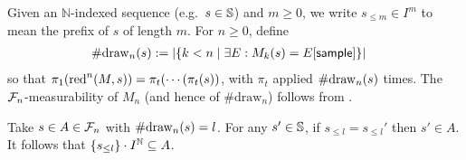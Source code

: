 Given an $\mathbb N$-indexed sequence (e.g.~$s \in {\mathbb{S}}$) and $m \geq 0$, we write $s_{\leq m} \in I^m$ to mean the prefix of $s$ of length $m$.
For $n \geq 0$, define
\begin{align*}
\#\mathrm{draw}_{n}(s) &:= |\{k < n \mid \exists E: M_k(s) = E[\mathsf{sample}]\}|
\end{align*}
so that $\pi_1 (\red^n(M, s)) = %
\pi_t( \cdots (\pi_t (s))$, with $\pi_t$ applied ${\#\mathrm{draw}_{n}(s)}$ times.
The $\mathcal{F}_n$-measurability of $M_n$ (and hence of $\#\mathrm{draw}_n$) follows from \cite{DBLP:conf/icfp/BorgstromLGS16}.
\iffalse
\akr{$\#\mathrm{draw}_n$ is not a stopping time. It doesn't look like you actually use this claim anyway, so it should just be fine to remove, but did you mean something different?} \lo{I agree, and I don't actually use this claim.}
\fi
Take $s \in A \in \mathcal{F}_n$ with $\#\mathrm{draw}_{n}(s) = l$.
For any $s'\in {\mathbb{S}}$, if $s_{\leq l} = s_{\leq l}'$ then $s' \in A$.
It follows that ${\{{s_{\leq l}}\} \cdot I^{\mathbb N}} \subseteq A$.

